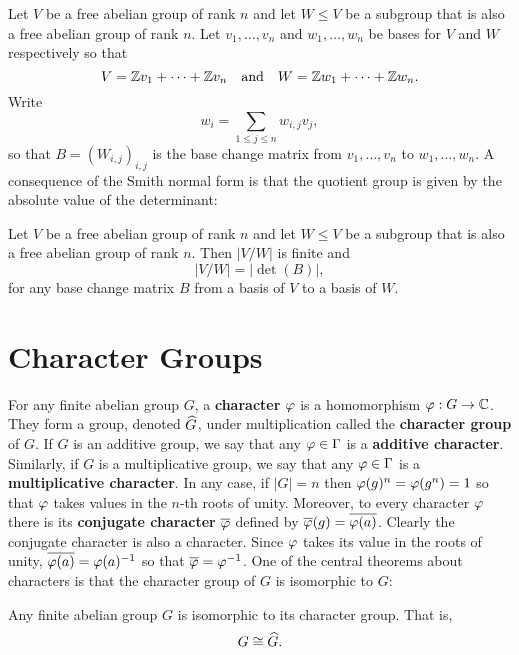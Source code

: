     Let $V$ be a free abelian group of rank $n$ and let $W \le V$ be a subgroup that is also a free abelian group of rank $n$. Let $v_{1},\ldots,v_{n}$ and $w_{1},\ldots,w_{n}$ be bases for $V$ and $W$ respectively so that
    \[
      V = \mathbb{Z} v_{1}+\cdots+\mathbb{Z} v_{n} \quad \text{and} \quad W = \mathbb{Z} w_{1}+\cdots+\mathbb{Z} w_{n}.
    \]
    Write
    \[
      w_{i} = \sum_{1 \le j \le n}w_{i,j}v_{j},
    \]
    so that $B = (W_{i,j})_{i,j}$ is the base change matrix from $v_{1},\ldots,v_{n}$ to $w_{1},\ldots,w_{n}$. A consequence of the Smith normal form is that the quotient group is given by the absolute value of the determinant:

    \begin{proposition}\label{prop:base_change_quotient_determinant}
      Let $V$ be a free abelian group of rank $n$ and let $W \le V$ be a subgroup that is also a free abelian group of rank $n$. Then $|V/W|$ is finite and
      \[
        |V/W| = |\det(B)|,
      \]
      for any base change matrix $B$ from a basis of $V$ to a basis of $W$.
    \end{proposition}
  \section{Character Groups}\label{append:Character_Groups}
    For any finite abelian group $G$, a \textbf{character} $\varphi$ is a homomorphism $\varphi:G \to \mathbb{C}$. They form a group, denoted $\widehat{G}$, under multiplication called the \textbf{character group} of $G$. If $G$ is an additive group, we say that any $\varphi \in \Gamma$ is a \textbf{additive character}. Similarly, if $G$ is a multiplicative group, we say that any $\varphi \in \Gamma$ is a \textbf{multiplicative character}. In any case, if $|G| = n$ then $\varphi(g)^{n} = \varphi(g^{n}) = 1$ so that $\varphi$ takes values in the $n$-th roots of unity. Moreover, to every character $\varphi$ there is its \textbf{conjugate character} $\overline{\varphi}$ defined by $\overline{\varphi}(g) = \overline{\varphi(a)}$. Clearly the conjugate character is also a character. Since $\varphi$ takes its value in the roots of unity, $\overline{\varphi(a)} = \varphi(a)^{-1}$ so that $\overline{\varphi} = \varphi^{-1}$. One of the central theorems about characters is that the character group of $G$ is isomorphic to $G$:

    \begin{proposition}\label{prop:character_group_isomorphim}
      Any finite abelian group $G$ is isomorphic to its character group. That is,
      \[
        G \cong \widehat{G}.
      \]
    \end{proposition}

